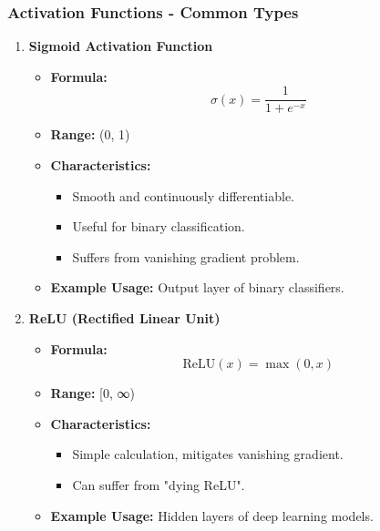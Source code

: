 \documentclass[aspectratio=169]{beamer}
\begin{document}
\begin{frame}[fragile]
    \frametitle{Activation Functions - Common Types}
    \begin{enumerate}
        \item \textbf{Sigmoid Activation Function}
            \begin{itemize}
                \item \textbf{Formula:} 
                \begin{equation}
                    \sigma(x) = \frac{1}{1 + e^{-x}}
                \end{equation}
                \item \textbf{Range:} (0, 1)
                \item \textbf{Characteristics:}
                \begin{itemize}
                    \item Smooth and continuously differentiable.
                    \item Useful for binary classification.
                    \item Suffers from vanishing gradient problem.
                \end{itemize}
                \item \textbf{Example Usage:} Output layer of binary classifiers.
            \end{itemize}
        
        \item \textbf{ReLU (Rectified Linear Unit)}
            \begin{itemize}
                \item \textbf{Formula:} 
                \begin{equation}
                    \text{ReLU}(x) = \max(0, x)
                \end{equation}
                \item \textbf{Range:} [0, ∞)
                \item \textbf{Characteristics:}
                \begin{itemize}
                    \item Simple calculation, mitigates vanishing gradient.
                    \item Can suffer from "dying ReLU".
                \end{itemize}
                \item \textbf{Example Usage:} Hidden layers of deep learning models.
            \end{itemize}
    \end{enumerate}
\end{frame}
\end{document}
